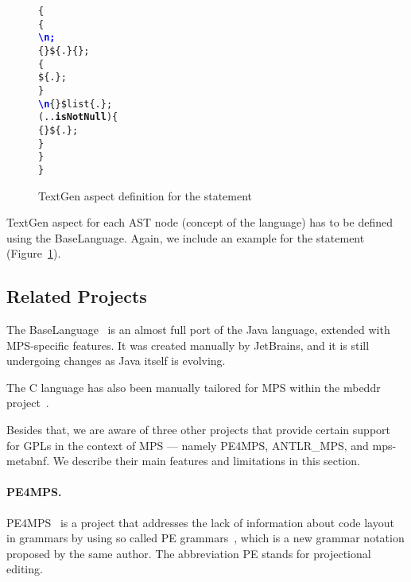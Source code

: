 \begin{figure}[ht]
\centering
\begin{alltt}
\small
{}  \{
   \{
     \textcolor{Blue}{\textbf{\textbackslash{}n;}}
     \{\} \$\{.\} \{\mpstgliteral{) \{}\};
     \{
       \$\{.\};
    \}
     \textcolor{Blue}{\textbf{\textbackslash{}n}} \{\mpstgliteral{\}}\} \$list\{.\};
     (..\textbf{isNotNull}) \{
       \{ \} \$\{.\};
    \}
  \}
\}
\end{alltt}
\caption{TextGen aspect definition for the  statement}
\label{fig:if_statement_textgen}
\end{figure}

TextGen aspect for each AST node (concept of the language) has to be defined using the BaseLanguage.
Again, we include an example for the  statement (Figure~\ref{fig:if_statement_textgen}).

\subsection{Related Projects}

The BaseLanguage~\cite{ref:BaseLanguage} is an almost full port of the Java language, extended with MPS-specific features.
It was created manually by JetBrains, and it is still undergoing changes as Java itself is evolving.

The C language has also been manually tailored for MPS within the mbeddr project~\cite{ref:MBEDDR}.

Besides that, we are aware of three other projects that provide certain support for GPLs in the context of MPS --- namely PE4MPS, ANTLR{\_}MPS, and mps-metabnf.
We describe their main features and limitations in this section.

\paragraph{PE4MPS.}
PE4MPS~\cite{ref:PE4MPS} is a project that addresses the lack of information about code layout in grammars by using so called PE grammars~\cite{ref:PE}, which is a new grammar notation proposed by the same author.
The abbreviation PE stands for projectional editing.

